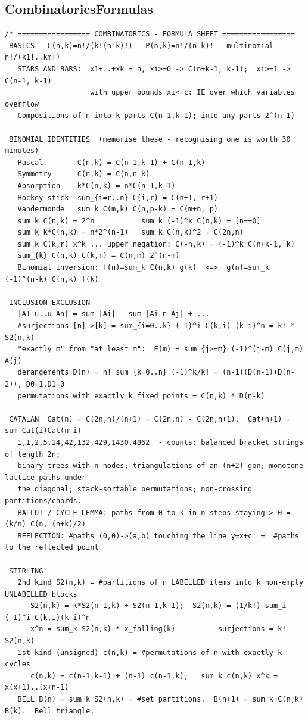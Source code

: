 \documentclass[9pt,a4paper,twocolumn]{extarticle}
\begin{document}
\filbreak
\subsection{CombinatoricsFormulas}
\nopagebreak
\begin{lstlisting}
/* ================= COMBINATORICS - FORMULA SHEET =================
 BASICS   C(n,k)=n!/(k!(n-k)!)   P(n,k)=n!/(n-k)!   multinomial n!/(k1!..km!)
   STARS AND BARS:  x1+..+xk = n, xi>=0 -> C(n+k-1, k-1);  xi>=1 -> C(n-1, k-1)
                    with upper bounds xi<=c: IE over which variables overflow
   Compositions of n into k parts C(n-1,k-1); into any parts 2^(n-1)

 BINOMIAL IDENTITIES  (memorise these - recognising one is worth 30 minutes)
   Pascal        C(n,k) = C(n-1,k-1) + C(n-1,k)
   Symmetry      C(n,k) = C(n,n-k)
   Absorption    k*C(n,k) = n*C(n-1,k-1)
   Hockey stick  sum_{i=r..n} C(i,r) = C(n+1, r+1)
   Vandermonde   sum_k C(m,k) C(n,p-k) = C(m+n, p)
   sum_k C(n,k) = 2^n           sum_k (-1)^k C(n,k) = [n==0]
   sum_k k*C(n,k) = n*2^(n-1)   sum_k C(n,k)^2 = C(2n,n)
   sum_k C(k,r) x^k ... upper negation: C(-n,k) = (-1)^k C(n+k-1, k)
   sum_{k} C(n,k) C(k,m) = C(n,m) 2^(n-m)
   Binomial inversion: f(n)=sum_k C(n,k) g(k)  <=>  g(n)=sum_k (-1)^(n-k) C(n,k) f(k)

 INCLUSION-EXCLUSION
   |A1 u..u An| = sum |Ai| - sum |Ai n Aj| + ...
   #surjections [n]->[k] = sum_{i=0..k} (-1)^i C(k,i) (k-i)^n = k! * S2(n,k)
   "exactly m" from "at least m":  E(m) = sum_{j>=m} (-1)^(j-m) C(j,m) A(j)
   derangements D(n) = n! sum_{k=0..n} (-1)^k/k! = (n-1)(D(n-1)+D(n-2)), D0=1,D1=0
   permutations with exactly k fixed points = C(n,k) * D(n-k)

 CATALAN  Cat(n) = C(2n,n)/(n+1) = C(2n,n) - C(2n,n+1),  Cat(n+1) = sum Cat(i)Cat(n-i)
   1,1,2,5,14,42,132,429,1430,4862  - counts: balanced bracket strings of length 2n;
   binary trees with n nodes; triangulations of an (n+2)-gon; monotone lattice paths under
   the diagonal; stack-sortable permutations; non-crossing partitions/chords.
   BALLOT / CYCLE LEMMA: paths from 0 to k in n steps staying > 0 = (k/n) C(n, (n+k)/2)
   REFLECTION: #paths (0,0)->(a,b) touching the line y=x+c  =  #paths to the reflected point

 STIRLING
   2nd kind S2(n,k) = #partitions of n LABELLED items into k non-empty UNLABELLED blocks
      S2(n,k) = k*S2(n-1,k) + S2(n-1,k-1);  S2(n,k) = (1/k!) sum_i (-1)^i C(k,i)(k-i)^n
      x^n = sum_k S2(n,k) * x_falling(k)          surjections = k! S2(n,k)
   1st kind (unsigned) c(n,k) = #permutations of n with exactly k cycles
      c(n,k) = c(n-1,k-1) + (n-1) c(n-1,k);   sum_k c(n,k) x^k = x(x+1)..(x+n-1)
   BELL B(n) = sum_k S2(n,k) = #set partitions.  B(n+1) = sum_k C(n,k) B(k).  Bell triangle.


\end{lstlisting}
\end{document}
